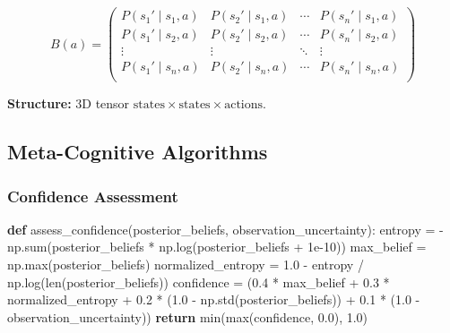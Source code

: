 \documentclass[
]{article}
\newenvironment{Shaded}{}{}
\newcommand{\BuiltInTok}[1]{\textcolor[rgb]{0.00,0.50,0.00}{#1}}
\newcommand{\ControlFlowTok}[1]{\textcolor[rgb]{0.00,0.44,0.13}{\textbf{#1}}}
\newcommand{\FloatTok}[1]{\textcolor[rgb]{0.25,0.63,0.44}{#1}}
\newcommand{\KeywordTok}[1]{\textcolor[rgb]{0.00,0.44,0.13}{\textbf{#1}}}
\newcommand{\NormalTok}[1]{#1}
\newcommand{\OperatorTok}[1]{\textcolor[rgb]{0.40,0.40,0.40}{#1}}
\begin{document}
\[B(a) = \begin{pmatrix}
P(s_1' \mid s_1,a) & P(s_2' \mid s_1,a) & \cdots & P(s_n' \mid s_1,a) \\
P(s_1' \mid s_2,a) & P(s_2' \mid s_2,a) & \cdots & P(s_n' \mid s_2,a) \\
\vdots & \vdots & \ddots & \vdots \\
P(s_1' \mid s_n,a) & P(s_2' \mid s_n,a) & \cdots & P(s_n' \mid s_n,a) \\
\end{pmatrix}\]

\textbf{Structure:} 3D tensor
\(\text{states} \times \text{states} \times \text{actions}\).

\subsection{Meta-Cognitive
Algorithms}\label{sec:meta_cognitive_algorithms}

\subsubsection{Confidence Assessment}\label{confidence-assessment}

\begin{Shaded}
\begin{Highlighting}[]
\KeywordTok{def}\NormalTok{ assess\_confidence(posterior\_beliefs, observation\_uncertainty):}
\NormalTok{    entropy }\OperatorTok{=} \OperatorTok{{-}}\NormalTok{np.}\BuiltInTok{sum}\NormalTok{(posterior\_beliefs }\OperatorTok{*}\NormalTok{ np.log(posterior\_beliefs }\OperatorTok{+} \FloatTok{1e{-}10}\NormalTok{))}
\NormalTok{    max\_belief }\OperatorTok{=}\NormalTok{ np.}\BuiltInTok{max}\NormalTok{(posterior\_beliefs)}
\NormalTok{    normalized\_entropy }\OperatorTok{=} \FloatTok{1.0} \OperatorTok{{-}}\NormalTok{ entropy }\OperatorTok{/}\NormalTok{ np.log(}\BuiltInTok{len}\NormalTok{(posterior\_beliefs))}
\NormalTok{    confidence }\OperatorTok{=}\NormalTok{ (}\FloatTok{0.4} \OperatorTok{*}\NormalTok{ max\_belief }\OperatorTok{+}
                 \FloatTok{0.3} \OperatorTok{*}\NormalTok{ normalized\_entropy }\OperatorTok{+}
                 \FloatTok{0.2} \OperatorTok{*}\NormalTok{ (}\FloatTok{1.0} \OperatorTok{{-}}\NormalTok{ np.std(posterior\_beliefs)) }\OperatorTok{+}
                 \FloatTok{0.1} \OperatorTok{*}\NormalTok{ (}\FloatTok{1.0} \OperatorTok{{-}}\NormalTok{ observation\_uncertainty))}
    \ControlFlowTok{return} \BuiltInTok{min}\NormalTok{(}\BuiltInTok{max}\NormalTok{(confidence, }\FloatTok{0.0}\NormalTok{), }\FloatTok{1.0}\NormalTok{)}
\end{Highlighting}
\end{Shaded}
\end{document}

